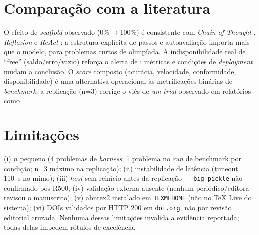 \section{Comparação com a literatura}

O efeito de \textit{scaffold} observado (0\%$\rightarrow$100\%) é consistente
com \textit{Chain-of-Thought} \cite{wei_cot}, \textit{Reflexion}
\cite{shinn_reflexion} e \textit{ReAct} \cite{yao_react}: a estrutura
explícita de passos e autoavaliação importa mais que o modelo, para problemas
curtos de olimpíada. A indisponibilidade real de ``free'' (saldo/erro/vazio)
reforça o alerta de \cite{schaeffer_mirage}: métricas e condições de
\textit{deployment} mudam a conclusão. O \textit{score} composto (acurácia,
velocidade, conformidade, disponibilidade) é uma alternativa operacional às
metrificações binárias de \textit{benchmark}; a replicação (n=3) corrige o
viés de \textit{um trial} observado em relatórios como \cite{openai_gpt4}.

\section{Limitações}

(i) $n$ pequeno (4 problemas de \textit{harness}; 1 problema no \textit{run}
de benchmark por condição; n=3 máximo na replicação); (ii) instabilidade de
latência (timeout 110~s no mimo); (iii) \textit{host} sem reinício antes da
replicação — \texttt{big-pickle} não confirmado pós-R500; (iv) validação
externa ausente (nenhum periódico/editora revisou o manuscrito); (v) abntex2
instalado em \texttt{TEXMFHOME} (não no TeX Live do sistema); (vi) DOIs
validados por HTTP 200 em \texttt{doi.org}, não por revisão editorial
cruzada. Nenhuma dessas limitações invalida a evidência reportada; todas
delas impedem rótulos de excelência.